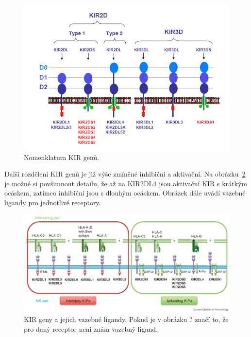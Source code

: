 \documentclass[czech,DP]{thesiskiv}
\begin{document}
\begin{figure}[H]		
		\centering
		\includegraphics[width=\textwidth]{./img/KIR_nomenklatura.png}
		\caption{Nomenklatura KIR genů. \cite{KIR_transplantace_jindra}}
		\label{fig:img_kir_nomenklatura}
\end{figure}

Další rozdělení KIR genů je již výše zmíněné inhibiční a aktivační. Na obrázku~\ref{fig:img_kir_ligand} je možné si povšimnout detailu, že až na KIR2DL4 jsou aktivační KIR s krátkým ocáskem, zatímco inhibiční jsou s dlouhým ocáskem. Obrázek dále uvádí vazebné ligandy pro jednotlivé receptory. 
 
\begin{figure}[H]		
		\centering
		\includegraphics[width=\textwidth]{./img/KIR_nomenklatura2.png}
		\caption{KIR geny a jejich vazebné ligandy. Pokud je v obrázku ? značí to, že pro daný receptor neni znám vazebný ligand. \cite{KIR_img_nomenklatura}}
		\label{fig:img_kir_ligand}
\end{figure}
\end{document}
